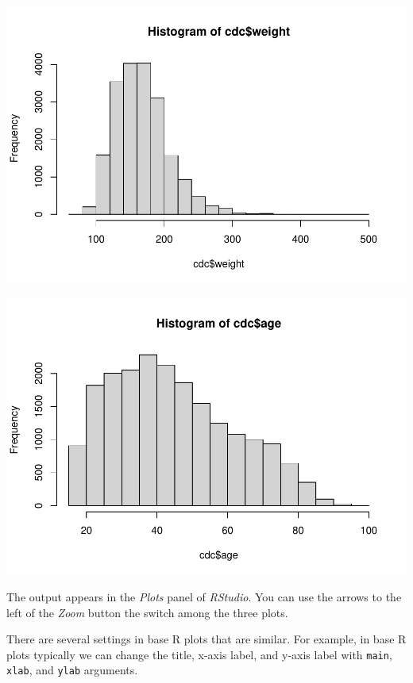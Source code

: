 \documentclass[
]{book}
\newenvironment{Shaded}{\begin{snugshade}}{\end{snugshade}}
\newcommand{\KeywordTok}[1]{\textcolor[rgb]{0.13,0.29,0.53}{\textbf{#1}}}
\newcommand{\NormalTok}[1]{#1}
\newcommand{\OperatorTok}[1]{\textcolor[rgb]{0.81,0.36,0.00}{\textbf{#1}}}
\begin{document}
\includegraphics{_main_files/figure-latex/unnamed-chunk-127-2.pdf}

\begin{Shaded}
\end{Shaded}

\includegraphics{_main_files/figure-latex/unnamed-chunk-127-3.pdf}

The output appears in the \emph{Plots} panel of \emph{RStudio}. You can use the arrows to the left of the \emph{Zoom} button the switch among the three plots.

There are several settings in base R plots that are similar. For example, in base R plots typically we can change the title, x-axis label, and y-axis label with \texttt{main}, \texttt{xlab}, and \texttt{ylab} arguments.
\end{document}
